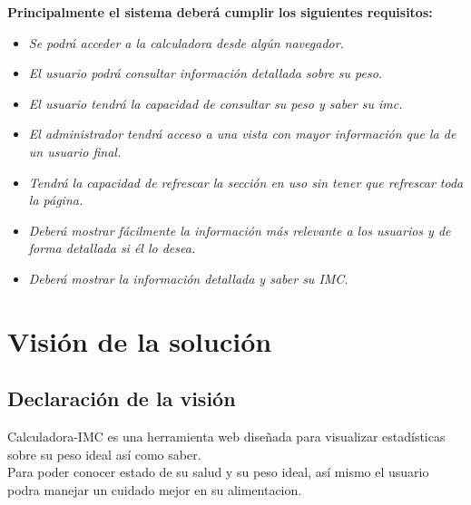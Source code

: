 \documentclass[12pt,a4paper]{book}
\begin{document}
\textbf{Principalmente el sistema deberá cumplir los siguientes requisitos: }
\vspace{0.5 cm}
\begin{itemize}
\item \textit{Se podrá acceder a la calculadora desde algún navegador.}
\item \textit{El usuario podrá consultar información detallada sobre su peso.}
\item \textit{El usuario tendrá la capacidad de consultar su peso y saber su imc.}
\item \textit{El administrador tendrá acceso a una vista con mayor información que la de un usuario final.}
\item \textit{Tendrá la capacidad de refrescar la sección en uso sin tener que refrescar toda la página.}
\item \textit{Deberá mostrar fácilmente la información más relevante a los usuarios y de forma detallada si él lo desea.}
\item \textit{Deberá mostrar la información detallada y saber su IMC.}
\end{itemize}

\chapter{Visión de la solución}

\section{Declaración de la visión}
\vspace{0.5 cm}
Calculadora-IMC es una herramienta web diseñada para visualizar estadísticas sobre su peso ideal así como saber.\\ 
Para poder conocer estado de su salud y su peso ideal, así mismo el usuario podra manejar un cuidado mejor en su alimentacion.\\
\end{document}
